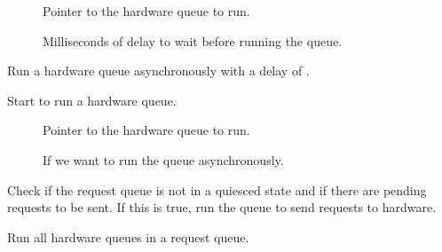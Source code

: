 \documentclass[a4paper,11pt,english]{sphinxmanual}
\begin{document}
\begin{description}
\item[{}] \leavevmode
Pointer to the hardware queue to run.

\item[{}] \leavevmode
Milliseconds of delay to wait before running the queue.

\end{description}


Run a hardware queue asynchronously with a delay of .

\begin{fulllineitems}
\label{\detokenize{blk-mq:c.blk_mq_run_hw_queue}}
Start to run a hardware queue.

\end{fulllineitems}


\begin{description}
\item[{}] \leavevmode
Pointer to the hardware queue to run.

\item[{}] \leavevmode
If we want to run the queue asynchronously.

\end{description}


Check if the request queue is not in a quiesced state and if there are
pending requests to be sent. If this is true, run the queue to send requests
to hardware.

\begin{fulllineitems}
\label{\detokenize{blk-mq:c.blk_mq_run_hw_queues}}
Run all hardware queues in a request queue.

\end{fulllineitems}
\end{document}

